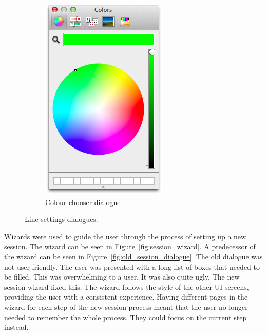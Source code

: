 \begin{figure}[h!]
\begin{subfigure}[b]{0.3\textwidth}
        \includegraphics[width=\textwidth]{images/colour_selector.png}
        \caption{Colour chooser dialogue}
        \label{fig:colour_picker}
    \end{subfigure}
    \caption{Line settings dialogues.}
    \label{fig:line_settings}
\end{figure}

Wizards were used to guide the user through the process of setting up a new session.  The wizard can be seen in Figure~\ref{fig:session_wizard}.  A predecessor of the wizard can be seen in Figure~\ref{fig:old_session_dialogue}.  The old dialogue was not user friendly.  The user was presented with a long list of boxes that needed to be filled.  This was overwhelming to a user.  It was also quite ugly.  The new session wizard fixed this.  The wizard follows the style of the other \ac{UI} screens, providing the user with a consistent experience.  Having different pages in the wizard for each step of the new session process meant that the user no longer needed to remember the whole process.  They could focus on the current step instead.

